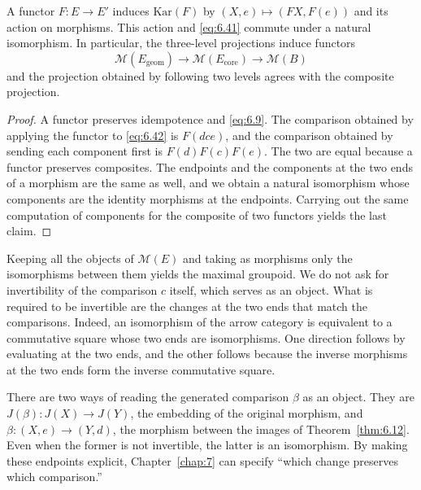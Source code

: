 \begin{proposition}\label{prop:6.28}

A functor $F:E\to E'$ induces $\mathrm{Kar}(F)$ by $(X,e)\mapsto(FX,F(e))$ and its action
on morphisms.
This action and \eqref{eq:6.41} commute under a natural isomorphism.
In particular, the three-level projections induce functors
\begin{equation*}
\mathcal{M}(E_{\mathrm{geom}})
\longrightarrow\mathcal{M}(E_{\mathrm{core}})
\longrightarrow\mathcal{M}(B)
\tag{6.43}\label{eq:6.43}
\end{equation*}
and the projection obtained by following two levels agrees with the composite projection.

\end{proposition}

\begin{proof}

A functor preserves idempotence and \eqref{eq:6.9}.
The comparison obtained by applying the functor to \eqref{eq:6.42} is $F(dce)$, and the
comparison obtained by sending each component first is $F(d)F(c)F(e)$. The two are equal
because a functor preserves composites.
The endpoints and the components at the two ends of a morphism are the same as well, and we
obtain a natural isomorphism whose components are the identity morphisms at the endpoints.
Carrying out the same computation of components for the composite of two functors yields
the last claim.

\end{proof}

\begin{construction}\label{cons:6.29}

Keeping all the objects of $\mathcal{M}(E)$ and taking as morphisms only the isomorphisms
between them yields the maximal groupoid.
We do not ask for invertibility of the comparison $c$ itself, which serves as an object.
What is required to be invertible are the changes at the two ends that match the
comparisons.
Indeed, an isomorphism of the arrow category is equivalent to a commutative square whose
two ends are isomorphisms.
One direction follows by evaluating at the two ends, and the other follows because the
inverse morphisms at the two ends form the inverse commutative square.

There are two ways of reading the generated comparison $\beta$ as an object.
They are $J(\beta):J(X)\to J(Y)$, the embedding of the original morphism, and
$\beta:(X,e)\to(Y,d)$, the morphism between the images of Theorem~\ref{thm:6.12}.
Even when the former is not invertible, the latter is an isomorphism.
By making these endpoints explicit, Chapter~\ref{chap:7} can specify ``which change
preserves which comparison.''

\end{construction}

